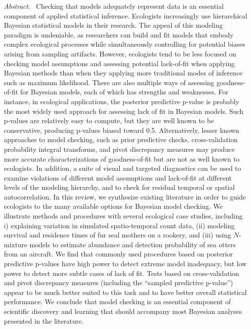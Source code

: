 \documentclass[12pt,english]{article}
\begin{document}
\begin{spacing}{1.9}
{\em Abstract.\ } Checking that models adequately represent data is an
essential component of applied statistical inference.  Ecologists
increasingly use hierarchical Bayesian statistical models in their
research.  The appeal of this modeling paradigm is undeniable, as
researchers can build and fit models that embody complex ecological
processes while simultaneously controlling for potential biases
arising from sampling artifacts. However, ecologists tend to be less
focused on checking model assumptions and assessing potential
lack-of-fit when applying Bayesian methods than when they applying
more traditional modes of inference such as maximum likelihood.  There
are also multiple ways of assessing goodness-of-fit for Bayesian
models, each of which has strengths and weaknesses.  For instance, in
ecological applications, the posterior predictive p-value is probably
the most widely used approach for assessing lack of fit in Bayesian
models. Such p-values are relatively easy to compute, but they are
well known to be conservative, producing p-values biased toward 0.5.
Alternatively, lesser known approaches to model checking, such as
prior predictive checks, cross-validation probability integral
transforms, and pivot discrepancy measures may produce more accurate
characterizations of goodness-of-fit but are not as well known to
ecologists.  In addition, a suite of visual and targeted diagnostics
can be used to examine violations of different model assumptions and
lack-of-fit at different levels of the modeling hierarchy, and to
check for residual temporal or spatial autocorrelation.  In this
review, we synthesize existing literature in order to guide ecologists
to the many available options for Bayesian model checking.  We
illustrate methods and procedures with several ecological case
studies, including i) explaining variation in simulated
spatio-temporal count data, (ii) modeling survival and residence
times of fur seal mothers on a rookery, and (iii) using $N$-mixture
models to estimate abundance and detection probability of sea otters
from an aircraft.  We find that commonly used procedures based on
posterior predictive p-values have high power to detect extreme model
inadequacy, but low power to detect more subtle cases of lack of fit.
Tests based on cross-validation and pivot discrepancy measures
(including the ``sampled predictive p-value'') appear to be much
better suited to this task and to have better overall statistical
performance. We conclude that model checking is an essential component
of scientific discovery and learning that should accompany most
Bayesian analyses presented in the literature.



\end{spacing}
\end{document}
